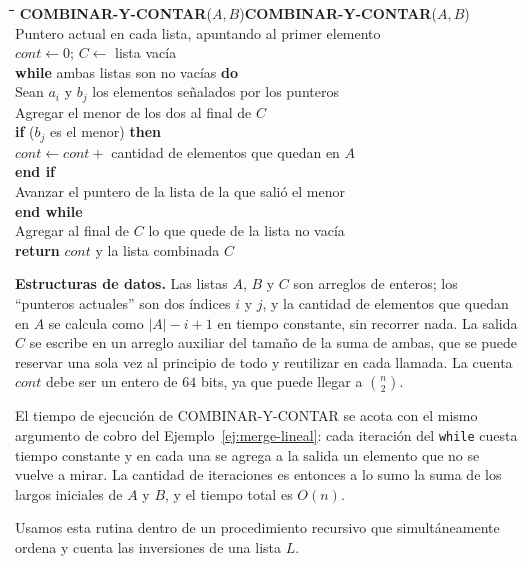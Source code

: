 \documentclass[12pt, spanish, oneside, openany]{book}
\newcommand{\pl}[1]{\makebox[1.6em][r]{\texttt{\footnotesize #1}}\hspace{0.9em}}
\newenvironment{pseudo}[1]{%
  \begin{center}%
  \begin{mdframed}[style=pseudobox]%
  \small
  \begin{tabbing}%
  \hspace{2.5em}\=\hspace{1.5em}\=\hspace{1.5em}\=\hspace{1.5em}\=\hspace{1.5em}\=\kill
  \def\pseudotitulo{#1}\ifx\pseudotitulo\empty\else#1\\[3pt]\fi}%
  {\end{tabbing}\end{mdframed}\end{center}}
\newenvironment{estructuras}%
  {\begin{center}\begin{minipage}{0.93\textwidth}\begin{mdframed}[style=estrbox]%
   \small\textbf{Estructuras de datos.}\;}%
  {\end{mdframed}\end{minipage}\end{center}}
\newcommand{\alg}[1]{#1}
\theoremstyle{uprightplain}
\theoremstyle{definition}
\theoremstyle{remark}
\theoremstyle{definition}
\begin{document}
\begin{pseudo}{\textbf{COMBINAR-Y-CONTAR}($A,B$)}
\pl{1}\> Puntero actual en cada lista, apuntando al primer elemento\\
\pl{2}\> $\mathit{cont} \leftarrow 0$; \quad $C \leftarrow$ lista vacía\\
\pl{3}\> \textbf{while} ambas listas son no vacías \textbf{do}\\
\pl{4}\>\> Sean $a_i$ y $b_j$ los elementos señalados por los punteros\\
\pl{5}\>\> Agregar el menor de los dos al final de $C$\\
\pl{6}\>\> \textbf{if} ($b_j$ es el menor) \textbf{then}\\
\pl{7}\>\>\> $\mathit{cont} \leftarrow \mathit{cont} + {}$ cantidad de elementos que quedan en $A$\\
\pl{8}\>\> \textbf{end if}\\
\pl{9}\>\> Avanzar el puntero de la lista de la que salió el menor\\
\pl{10}\> \textbf{end while}\\
\pl{11}\> Agregar al final de $C$ lo que quede de la lista no vacía\\
\pl{12}\> \textbf{return} $\mathit{cont}$ y la lista combinada $C$
\end{pseudo}

\begin{estructuras}
Las listas $A$, $B$ y $C$ son arreglos de enteros; los ``punteros actuales'' son
dos índices $i$ y $j$, y la cantidad de elementos que quedan en $A$ se calcula
como $|A|-i+1$ en tiempo constante, sin recorrer nada. La salida $C$ se escribe
en un arreglo auxiliar del tamaño de la suma de ambas, que se puede reservar una
sola vez al principio de todo y reutilizar en cada llamada. La cuenta
$\mathit{cont}$ debe ser un entero de $64$ bits, ya que puede llegar a
$\binom{n}{2}$.
\end{estructuras}

El tiempo de ejecución de \alg{COMBINAR-Y-CONTAR} se acota con el mismo argumento de cobro del Ejemplo~\ref{ej:merge-lineal}: cada iteración del \texttt{while} cuesta tiempo constante y en cada una se agrega a la salida un elemento que no se vuelve a mirar. La cantidad de iteraciones es entonces a lo sumo la suma de los largos iniciales de $A$ y $B$, y el tiempo total es $O(n)$.

Usamos esta rutina dentro de un procedimiento recursivo que simultáneamente ordena y cuenta las inversiones de una lista $L$.
\end{document}
